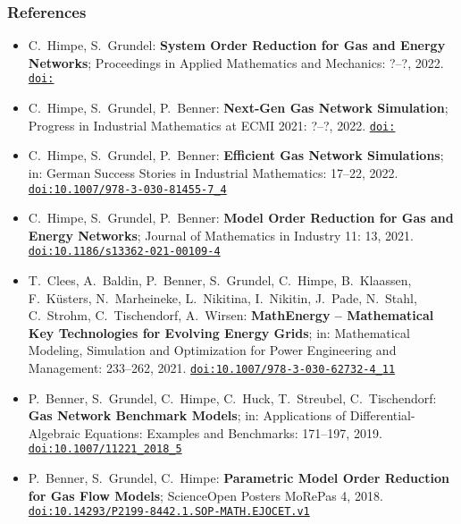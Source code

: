 \documentclass[%
aspectratio=43 %
,table %
]{beamer}
\begin{document}
\begin{frame}\frametitle{References}

\scriptsize

\begin{itemize}

 \item C.~Himpe, S.~Grundel: \textbf{System Order Reduction for Gas and Energy Networks}; Proceedings in Applied Mathematics and Mechanics: ?--?, 2022. \href{https://doi.org/}{\texttt{doi:}}

 \item C.~Himpe, S.~Grundel, P.~Benner: \textbf{Next-Gen Gas Network Simulation}; Progress in Industrial Mathematics at ECMI 2021: ?--?, 2022. \href{https://doi.org/}{\texttt{doi:}}

 \item C.~Himpe, S.~Grundel, P.~Benner: \textbf{Efficient Gas Network Simulations}; in: German Success Stories in Industrial Mathematics: 17--22, 2022. \href{https://doi.org/10.1007/978-3-030-81455-7\_4}{\texttt{doi:10.1007/978-3-030-81455-7\_4}}

 \item C.~Himpe, S.~Grundel, P.~Benner: \textbf{Model Order Reduction for Gas and Energy Networks}; Journal of Mathematics in Industry 11: 13, 2021. \href{https://doi.org/10.1186/s13362-021-00109-4}{\texttt{doi:10.1186/s13362-021-00109-4}}

 \item T.~Clees, A.~Baldin, P.~Benner, S.~Grundel, C.~Himpe, B.~Klaassen, F.~Küsters, N.~Marheineke, L.~Nikitina, I.~Nikitin, J.~Pade, N.~Stahl, C.~Strohm, C.~Tischendorf, A.~Wirsen: \textbf{MathEnergy – Mathematical Key Technologies for Evolving Energy Grids}; in: Mathematical Modeling, Simulation and Optimization for Power Engineering and Management: 233--262, 2021. \href{https://doi.org/10.1007/978-3-030-62732-4\_11}{\texttt{doi:10.1007/978-3-030-62732-4\_11}} 

 \item P.~Benner, S.~Grundel, C.~Himpe, C.~Huck, T.~Streubel, C.~Tischendorf: \textbf{Gas Network Benchmark Models}; in: Applications of Differential-Algebraic Equations: Examples and Benchmarks: 171--197, 2019. \href{https://doi.org/10.1007/11221\_2018\_5}{\texttt{doi:10.1007/11221\_2018\_5}}

 \item P.~Benner, S.~Grundel, C.~Himpe: \textbf{Parametric Model Order Reduction for Gas Flow Models}; ScienceOpen Posters MoRePas 4, 2018. \href{https://doi.org/10.14293/P2199-8442.1.SOP-MATH.EJOCET.v1}{\texttt{doi:10.14293/P2199-8442.1.SOP-MATH.EJOCET.v1}}

\end{itemize}

\end{frame}
\end{document}

